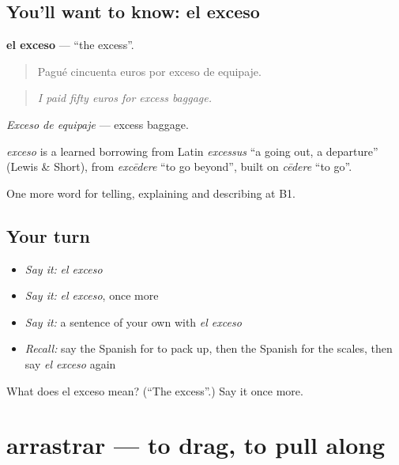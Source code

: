 \subsection*{You'll want to know: el exceso}
\textbf{el exceso} — \textquotedblleft{}the excess\textquotedblright{}.

\begin{quote}
Pagué cincuenta euros por exceso de equipaje.
\end{quote}

\begin{quote}
\emph{I paid fifty euros for excess baggage.}
\end{quote}

\emph{Exceso de equipaje} — excess baggage.

\begin{cousinweb}
\emph{exceso} is a learned borrowing from Latin \emph{excessus} \textquotedblleft{}a going out, a departure\textquotedblright{} (Lewis \& Short), from \emph{excēdere} \textquotedblleft{}to go beyond\textquotedblright{}, built on \emph{cēdere} \textquotedblleft{}to go\textquotedblright{}.
\end{cousinweb}

\begin{grammarlens}[title={What you've built}]
One more word for telling, explaining and describing at B1.
\end{grammarlens}

\subsection*{Your turn}
\begin{itemize}
\raggedright
  \item \emph{Say it:} \emph{el exceso}
  \item \emph{Say it:} \emph{el exceso}, once more
  \item \emph{Say it:} a sentence of your own with \emph{el exceso}
  \item \emph{Recall:} say the Spanish for to pack up, then the Spanish for the scales, then say \emph{el exceso} again
\end{itemize}

\begin{tcolorbox}[breakable,colback=teal!4,colframe=teal!35!black,title={Before you move on}]
What does el exceso mean? (\textquotedblleft{}The excess\textquotedblright{}.) Say it once more.
\end{tcolorbox}
\section[arrastrar]{arrastrar — to drag, to pull along}

